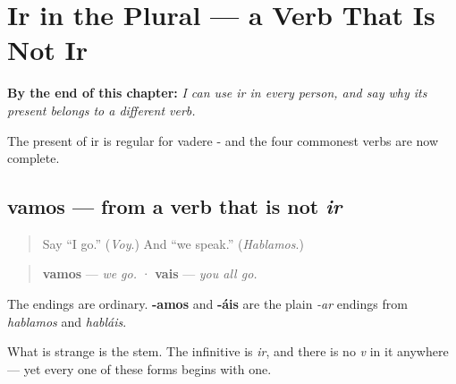 
\chapter{Ir in the Plural --- a Verb That Is Not Ir}
\label{ch:spanish-ir-plural}

\begin{chapteropening}
\textbf{By the end of this chapter:} \emph{I can use ir in every person, and say why its present belongs to a different verb.}

The present of ir is regular for vadere - and the four commonest verbs are now complete.
\end{chapteropening}

\section[vamos · vais]{vamos — from a verb that is not \emph{ir}}

\label{lesson:ES-C10-vamos}



\begin{quote}
Say \textquotedblleft{}I go.\textquotedblright{} (\emph{Voy}.) And \textquotedblleft{}we speak.\textquotedblright{} (\emph{Hablamos}.)
\end{quote}

\begin{grammarlens}[title={Grammar Lens: -amos and -áis, on a stem you have not seen}]
\begin{quote}
\textbf{vamos} — \emph{we go.}  ·  \textbf{vais} — \emph{you all go.}
\end{quote}

The endings are ordinary. \textbf{-amos} and \textbf{-áis} are the plain \emph{-ar} endings from \emph{hablamos} and \emph{habláis}.

What is strange is the stem. The infinitive is \emph{ir}, and there is no \emph{v} in it anywhere — yet every one of these forms begins with one.
\end{grammarlens}

